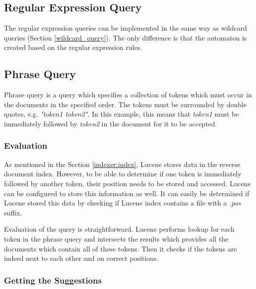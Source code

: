 \subsection{Regular Expression Query}
The regular expression queries can be implemented in the same way as wildcard queries (Section \ref{wildcard_query}). The only difference
is that the automaton is created based on the regular expression rules.

\subsection{Phrase Query}
\label{suggest_phrase_query}
Phrase query is a query which specifies a collection of tokens which must occur in the documents in the specified order.
The tokens must be surrounded by double quotes, e.g. \textit{"token1 token2"}. In this example, this means that \textit{token1} must be immediately followed by
\textit{token2} in the document for it to be accepted.

\subsubsection{Evaluation}
\label{prefix_evaluation}
As mentioned in the Section \ref{indexer:index},
Lucene stores data in the reverse document index. However, to be able to determine if one token is immediately followed by another
token, their position needs to be stored and accessed. Lucene can be configured to store this information as well.
It can easily be determined if Lucene stored this data by checking if Lucene index contains a file with a \textit{.pos}
suffix.

Evaluation of the query is straightforward. Lucene performs lookup for each token in the phrase query and intersects the
results which provides all the documents which contain all of these tokens. Then it checks if the tokens are indeed
next to each other and on correct positions.

\subsubsection{Getting the Suggestions}
